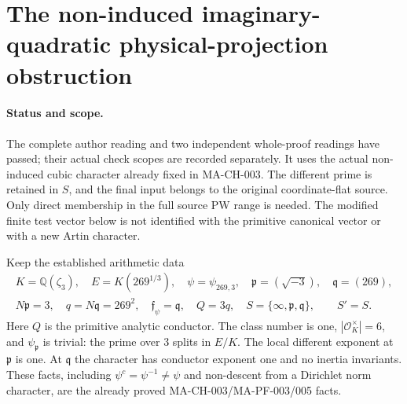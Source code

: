 \section{The non-induced imaginary-quadratic physical-projection obstruction}
\label{sec:imaginary-projection-obstruction}

\paragraph{Status and scope.}
The complete author reading and two independent whole-proof
readings have passed; their actual check scopes are recorded separately.  It uses the actual non-induced cubic character
already fixed in MA-CH-003.  The different prime is retained in $S$,
and the final input belongs to the original coordinate-flat source.
Only direct membership in the full source PW range is needed.
The modified finite test vector below is not identified with the
primitive canonical vector or with a new Artin character.

Keep the established arithmetic data
\[
 \begin{gathered}
 K=\mathbb Q(\zeta_3),\quad E=K(269^{1/3}),\quad
 \psi=\psi_{269,3},\quad
 \mathfrak p=(\sqrt{-3}),\quad \mathfrak q=(269),\\
 N\mathfrak p=3,\quad q=N\mathfrak q=269^2,\quad
 \mathfrak f_\psi=\mathfrak q,\quad Q=3q,\quad
 S=\{\infty,\mathfrak p,\mathfrak q\},\qquad S'=S.
 \end{gathered}
 \tag{MA-PI.120}
\]
Here $Q$ is the primitive analytic conductor.
The class number is one, $|\mathcal O_K^\times|=6$,
and $\psi_{\mathfrak p}$ is trivial: the prime over $3$
splits in $E/K$.  The local different exponent at
$\mathfrak p$ is one.  At $\mathfrak q$ the character
has conductor exponent one and no inertia invariants.
These facts, including $\psi^c=\psi^{-1}\ne\psi$ and
non-descent from a Dirichlet norm character, are the
already proved MA-CH-003/MA-PF-003/005 facts.

